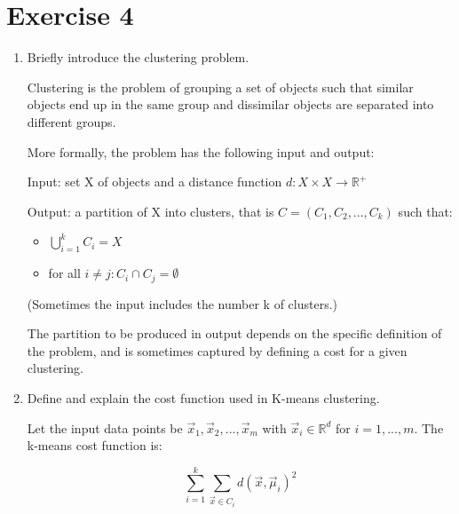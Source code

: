 \documentclass[a4paper,11pt,oneside]{book}
\begin{document}
\section{Exercise 4}
\begin{enumerate}
    \item Briefly introduce the clustering problem.
        \begin{solution}
            Clustering is the problem of grouping a set of objects such that similar objects end up in the same group and dissimilar objects are separated into different groups.
            
            More formally, the problem has the following input and output:
            
            Input: set X of objects and a distance function $d: X \times X \to \mathbb{R}^+$
            
            Output: a partition of X into clusters, that is $C = (C_1, C_2, ..., C_k)$ such that:
            \begin{itemize}
            \item $\bigcup_{i=1}^k C_i = X$
            \item for all $i \neq j : C_i \cap C_j = \emptyset$
            \end{itemize}
            
            (Sometimes the input includes the number k of clusters.)
            
            The partition to be produced in output depends on the specific definition of the problem, and is sometimes captured by defining a cost for a given clustering.
        \end{solution}

    \item Define and explain the cost function used in K-means clustering.
        \begin{solution}
            Let the input data points be $\vec{x}_1, \vec{x}_2, ..., \vec{x}_m$ with $\vec{x}_i \in \mathbb{R}^d$ for $i=1,...,m$. The k-means cost function is:
            
            $$\sum_{i=1}^k \sum_{\vec{x}\in C_i} d(\vec{x},\vec{\mu}_i)^2$$
            

\end{solution}
\end{enumerate}
\end{document}
